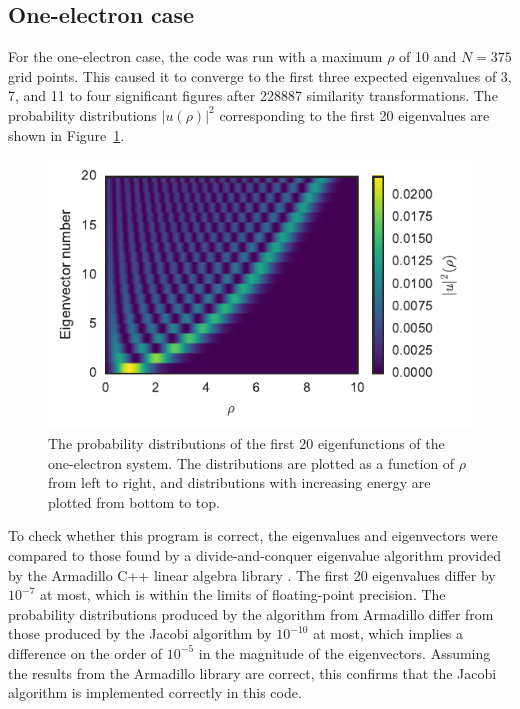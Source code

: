 \documentclass[aps,prc,reprint]{revtex4-1}
\begin{document}
    \subsection{One-electron case}
    \label{sub:oneelecresults}
        For the one-electron case, the code was run with a maximum $\rho$ of 10 and $N=375$ grid points. This caused it to converge to the first three expected eigenvalues of 3, 7, and 11 to four significant figures after \num{228887} similarity transformations. The probability distributions $|u(\rho)|^2$ corresponding to the first 20 eigenvalues are shown in Figure~\ref{fig:eigvecs}.

        \begin{figure}
            \includegraphics{eigenvecs.pdf}
            \caption{The probability distributions of the first 20 eigenfunctions of the one-electron system. The distributions are plotted as a function of $\rho$ from left to right, and distributions with increasing energy are plotted from bottom to top.}
            \label{fig:eigvecs}
        \end{figure}

        To check whether this program is correct, the eigenvalues and eigenvectors were compared to those found by a divide-and-conquer eigenvalue algorithm provided by the Armadillo C++ linear algebra library \cite{Sanderson2010}. The first 20 eigenvalues differ by $10^{-7}$ at most, which is within the limits of floating-point precision. The probability distributions produced by the algorithm from Armadillo differ from those produced by the Jacobi algorithm by $10^{-10}$ at most, which implies a difference on the order of $10^{-5}$ in the magnitude of the eigenvectors. Assuming the results from the Armadillo library are correct, this confirms that the Jacobi algorithm is implemented correctly in this code.
\end{document}
